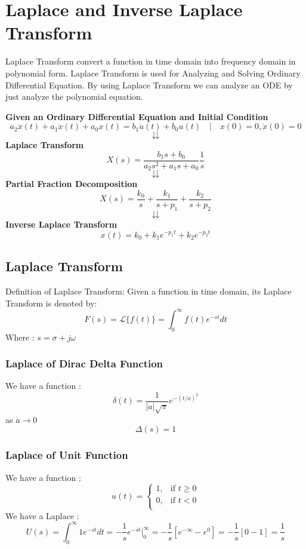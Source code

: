 \chapter{Laplace and Inverse Laplace Transform}
Laplace Transform convert a function in time domain into frequency domain in polynomial form. Laplace Transform is used for Analyzing and Solving Ordinary Differential Equation. By using Laplace Transform we can analyze an ODE by just analyze the polynomial equation.
\begin{tcolorbox}[title=Process]
	\begin{center}
		\textbf{Given an Ordinary Differential Equation and Initial Condition}
		\[
		a_2\ddot{x}(t) + a_1\dot{x}(t)+a_0x(t)=b_1\dot{u}(t)+b_0u(t)\quad|\quad x(0) = 0,\dot{x}(0) = 0
		\]
		\[
		\downdownarrows
		\]
		\textbf{Laplace Transform}
		\[
		X(s) = \frac{b_1s+b_0}{a_2s^2+a_1s+a_0} \frac{1}{s}
		\]
		\[
		\downdownarrows
		\]
		\textbf{Partial Fraction Decomposition}
		\[
		X(s) = \frac{k_0}{s}+\frac{k_1}{s+p_1}+\frac{k_2}{s+p_2}
		\]
		\[
		\downdownarrows
		\]
		\textbf{Inverse Laplace Transform}
		\[
		x(t) = k_0 + k_1e^{-p_1t} + k_2e^{-p_2t}
		\]
	\end{center}
\end{tcolorbox}


\section{Laplace Transform}
Definition of Laplace Transform: Given a function in time domain, its Laplace Transform is denoted by:
\[
F(s) = \mathcal{L}\{f(t)\} = \int_{0}^{\infty} f(t)e^{-st} dt
\]
Where : \(s = \sigma + j\omega\)

\subsection{Laplace of Dirac Delta Function}
We have a function :
\[
\delta(t) = \frac{1}{|a|\sqrt{\pi}}e^{-(t/a)^2}
\]
as \(a \rightarrow 0\)
\[
\Delta(s) = 1
\]

\subsection{Laplace of Unit Function}
We have a function :
\[
u(t) = 
\begin{cases}
	1, & \text{if } t\geq 0 \\
	0, & \text{if } t<0     \\
\end{cases}       
\]
We have a Laplace :
\[
U(s) = \int_{0}^{\infty} 1e^{-st} dt = -\frac{1}{s} e^{-st} |_0^\infty = -\frac{1}{s}[e^{-\infty} - e^{0}] = -\frac{1}{s}[0 - 1] = \frac{1}{s}
\]

